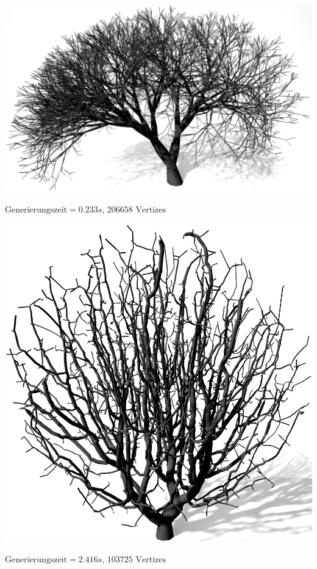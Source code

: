 \newpage
\begin{center}
	\includegraphics[height=.9\textheight]{images/Performance_LS_Ternary_4_Tropism}
	
	
	$\text{Generierungszeit}= 0.233s$, $206658 \text{ Vertizes}$
\end{center}




\newpage
\begin{center}
	\includegraphics[height=.9\textheight]{images/Performance_SCA_Quali_Segments_High}
	
	$\text{Generierungszeit} = 2.416s$, $103725 \text{ Vertizes}$
\end{center}






